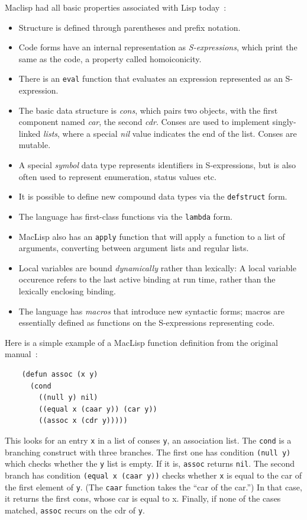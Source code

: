 \documentclass[format=acmsmall, review]{acmart}
\begin{document}
Maclisp had all basic properties associated with Lisp today~\cite{Moon1974}:
%
\begin{itemize}
\item Structure is defined through parentheses and prefix notation.
\item Code forms have an internal representation as
  \textit{S-expressions}, which print the same as the code, a property called
  homoiconicity.
\item There is an \texttt{eval} function that evaluates an expression
  represented as an S-expression.
\item The basic data structure is \textit{cons}, which pairs two
  objects, with the first component named \textit{car}, the second
  \textit{cdr}.  Conses are used to implement singly-linked
  \textit{lists}, where a special \textit{nil} value indicates the end
  of the list.  Conses are mutable.
\item A special \textit{symbol} data type represents identifiers in
  S-expressions, but is also often used to represent enumeration,
  status values etc.
\item It is possible to define new compound data types via the
  \texttt{defstruct} form.
\item The language has first-class functions via the \texttt{lambda}
  form.
\item MacLisp also has an \texttt{apply} function that will apply a
  function to a list of arguments, converting between argument lists
  and regular lists.
\item Local variables are bound \textit{dynamically} rather than
  lexically: A local variable occurence refers to the last active
  binding at run time, rather than the lexically enclosing binding.
\item The language has \textit{macros} that introduce new syntactic
  forms; macros are essentially defined as functions on the S-expressions
  representing code.
\end{itemize}
%
Here is a simple example of a MacLisp function definition from the
original manual~\cite{Moon1974}:
%
\begin{verbatim}
    (defun assoc (x y)
      (cond
        ((null y) nil)
        ((equal x (caar y)) (car y))
        ((assoc x (cdr y)))))
\end{verbatim}
%
This looks for an entry \texttt{x} in a list of conses \texttt{y}, an
association list.  The \texttt{cond} is a branching construct with
three branches.  The first one has condition \texttt{(null y)} which
checks whether the \texttt{y} list is empty.  If it is, \texttt{assoc}
returns \texttt{nil}.  The second branch has condition \texttt{(equal
  x (caar y))} checks whether \texttt{x} is equal to the car of the
first element of \texttt{y}.  (The \texttt{caar} function takes the
``car of the car.'')  In that case, it returns the first cons, whose
car is equal to x.  Finally, if none of the cases matched,
\texttt{assoc} recurs on the cdr of \texttt{y}.
\end{document}
